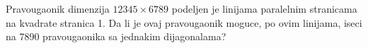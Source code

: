 \problem
Pravougaonik dimenzija $12345 \times 6789$ podeljen je linijama paralelnim stranicama na kvadrate stranica 1.
Da li je ovaj pravougaonik moguce, po ovim linijama, iseci na 7890 pravougaonika sa jednakim dijagonalama?
\solution
\endproblem
